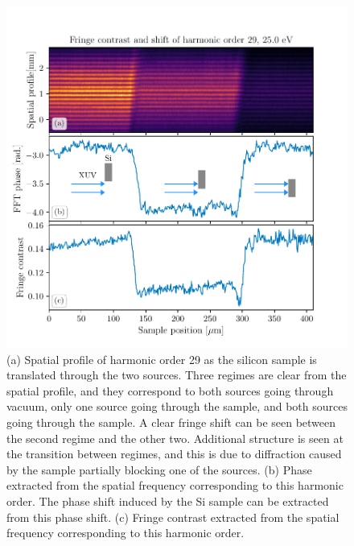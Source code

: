 \begin{figure}
	\centering
	\includegraphics[width=1.0\textwidth]{figures/refractive_index/spatialgram_fringe_shift_contrast.pdf}
	\caption[Spatial profile and fringe shift of a harmonic as sample is translated across the two XUV sources]{(a) Spatial profile of harmonic order 29 as the silicon sample is translated through the two sources. Three regimes are clear from the spatial profile, and they correspond to both sources going through vacuum, only one source going through the sample, and both sources going through the sample.  A clear fringe shift can be seen between the second regime and the other two.  Additional structure is seen at the transition between regimes, and this is due to diffraction caused by the sample partially blocking one of the sources. (b) Phase extracted from the spatial frequency corresponding to this harmonic order.  The phase shift induced by the Si sample can be extracted from this phase shift. (c) Fringe contrast extracted from the spatial frequency corresponding to this harmonic order.}
	\label{fig:harmonic_phase_shift}
\end{figure}


